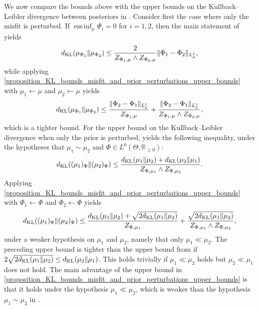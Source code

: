 \documentclass[a4paper]{scrartcl}
\theoremstyle{definition}
\numberwithin{equation}{section}
\newcommand{\R}{\mathbb{R}}
\DeclareMathOperator*{\essinf}{ess\,inf}
\newcommand{\norm}[1]{\Vert #1 \Vert}
\newcommand{\KL}[0]{\textup{KL}}
\begin{document}
We now compare the bounds above with the upper bounds on the Kullback--Leibler divergence between posteriors in \cite{Sprungk2020}.
Consider first the case where only the misfit is perturbed.
If $\essinf_\mu\Phi_i=0$ for $i=1,2$, then the main statement of \cite[Theorem 11]{Sprungk2020} yields 
\begin{equation*}
 d_{\KL}(\mu_{\Phi_1}\Vert \mu_{\Phi_2})\leq \frac{2}{Z_{\Phi_1,\mu}\wedge Z_{\Phi_2,\mu}}\norm{\Phi_1-\Phi_2}_{L^1_\mu},
\end{equation*}
while applying \ref{proposition_KL_bounds_misfit_and_prior_perturbations_upper_bounds} with $\mu_1\leftarrow \mu$ and $\mu_2\leftarrow \mu$ yields
\begin{equation*}
 d_{\KL}(\mu_{\Phi_1}\Vert \mu_{\Phi_2})\leq \frac{\norm{\Phi_2-\Phi_1}_{L^1_\mu}}{Z_{\Phi_1,\mu}}+\frac{\norm{\Phi_2-\Phi_1}_{L^1_\mu}}{Z_{\Phi_1,\mu}\wedge Z_{\Phi_2,\mu}},
\end{equation*}
which is a tighter bound. For the upper bound on the Kullback--Leibler divergence when only the prior is perturbed, \cite[Theorem 12]{Sprungk2020} yields the following inequality, under the hypotheses that $\mu_1\sim\mu_2$ and $\Phi\in L^0(\Theta,\R_{\geq 0})$:
\begin{equation*}
 d_{\KL}((\mu_1)_{\Phi}\Vert (\mu_2)_{\Phi}) \leq \frac{d_{\KL}(\mu_1\Vert \mu_2)+d_{\KL}(\mu_2\Vert \mu_1)}{Z_{\Phi,\mu_1}\wedge Z_{\Phi,\mu_2}}.
\end{equation*}
Applying \ref{proposition_KL_bounds_misfit_and_prior_perturbations_upper_bounds} with $\Phi_1\leftarrow \Phi$ and $\Phi_2\leftarrow \Phi$ yields
\begin{equation*}
 d_{\KL}((\mu_1)_{\Phi}\Vert (\mu_2)_{\Phi}) \leq \frac{d_{\KL}(\mu_1\Vert \mu_2)+\sqrt{2d_{\KL}(\mu_1\Vert \mu_2)}}{Z_{\Phi,\mu_1}}+\frac{\sqrt{2d_{\KL}(\mu_1\Vert \mu_2)}}{Z_{\Phi,\mu_1}\wedge Z_{\Phi,\mu_2}},
\end{equation*}
under a weaker hypothesis on $\mu_1$ and $\mu_2$, namely that only $\mu_1\ll \mu_2$.
The preceding upper bound is tighter than the upper bound from \cite[Theorem 12]{Sprungk2020} if $2\sqrt{2d_{\KL}(\mu_1\Vert \mu_2)}\leq d_{\KL}(\mu_2\Vert \mu_1)$. 
This holds trivially if $\mu_1\ll\mu_2$ holds but $\mu_2\ll\mu_1$ does not hold.
The main advantage of the upper bound in  \ref{proposition_KL_bounds_misfit_and_prior_perturbations_upper_bounds} is that it holds under the hypothesis $\mu_1\ll\mu_2$, which is weaker than the hypothesis $\mu_1\sim\mu_2$ in \cite[Theorem 12]{Sprungk2020}.
\end{document}
